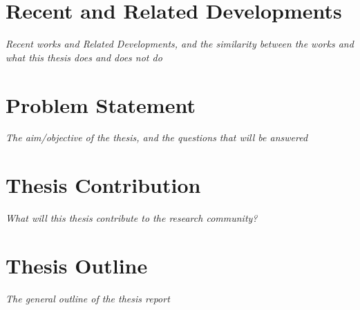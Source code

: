 \section{Recent and Related Developments}
\emph{Recent works and Related Developments, and the similarity between the works and what this thesis does and does not do}
\section{Problem Statement}
\emph{The aim/objective of the thesis, and the questions that will be answered}

\section{Thesis Contribution}
\emph{What will this thesis contribute to the research community?}

\section{Thesis Outline}
\emph{The general outline of the thesis report}

